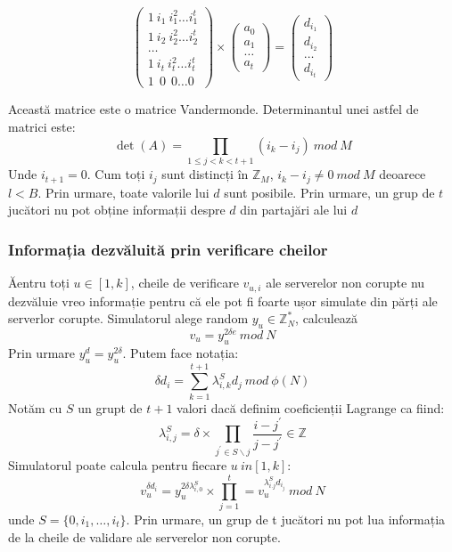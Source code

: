 \documentclass[12pt, oneside]{book}
\begin{document}
\[
\left (
\begin{array}{cc}
1 \ i_1 \ i_{1}^{2}  \dots  i_{1}^{t} \\
1 \ i_2 \ i_{2}^{2}  \dots  i_{2}^{t} \\
 \dots  \\
1 \ i_t \ i_{t}^{2}  \dots  i_{t}^{t} \\
1 \ \ 0 \ \ 0  \dots  0 


\end{array}
\right) 
\times
\left (
\begin{array}{c}
a_0 \\
a_1 \\
 \dots  \\
a_t  
\end{array}
\right)
=
\left(
\begin{array}{c}
d_{i_1} \\
d_{i_2} \\
 \dots  \\
d_{i_t}
\end{array}
\right)
\]

Această matrice este o matrice Vandermonde. Determinantul unei astfel de matrici este:
$$ \det(A) = \prod_{1 \leq j < k <t+1}^{} (i_k - i_j) \ mod \ M$$
Unde $i_{t+1} = 0$. Cum toți $i_j$ sunt distincți în $\mathbb{Z}_{M}$, $i_k - i_j \neq 0 \ mod \ M$ deoarece $l < B$. Prin urmare, toate valorile lui $d$ sunt posibile. Prin urmare, un grup de $t$ jucători nu pot obține informații despre $d$ din partajări ale lui $d$

\subsubsection{Informația dezvăluită prin verificare cheilor}
Ăentru toți $u \in [1,k]$, cheile de verificare $v_{u,i}$ ale serverelor non corupte nu dezvăluie vreo informație pentru că ele pot fi foarte ușor simulate din părți ale serverlor corupte. Simulatorul alege random $y_u \in \mathbb{Z}_{N}^{*}$, calculează 
$$v_u = y_{u}^{2 \delta e} \ mod \ N$$ 
Prin urmare $y_{u}^{d} = y_{u}^{2 \delta}$. Putem face notația: 
$$\delta d_i = \sum_{k=1}^{t+1} \lambda_{i,k}^{S} d_j \ mod \ \phi(N)$$
Notăm cu $S$ un grupt de $t+1$ valori dacă definim coeficienții Lagrange ca fiind:
$$\lambda_{i,j}^{S} = \delta \times \prod_{j^{'} \in S \smallsetminus j}^{} \frac{i - j^{'}}{j - j^{'}} \in \mathbb{Z}  $$
Simulatorul poate calcula pentru fiecare $u \ in [1,k]$:
$$v_{u}^{\delta d_i} = y_{u}^{2 \delta \lambda_{i,0}^{S}}  \times \prod_{j=1}^{t} = v_{u}^{\lambda_{i.j}^{S} d_{i_j}    } \ mod \ N     $$
unde $S = \lbrace 0,i_1, \dots ,i_t \rbrace$. Prin urmare, un grup de t jucători nu pot lua informația de la cheile de validare ale serverelor non corupte.
\end{document}
